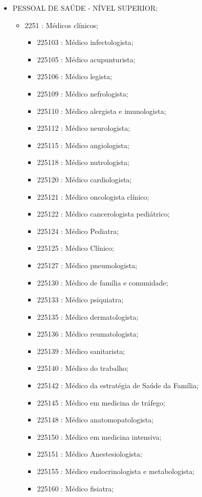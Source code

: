
\begin{itemize}
  \item PESSOAL DE SAÚDE - NÍVEL SUPERIOR;
  \begin{itemize}
    \item 2251 : Médicos clínicos;
    \begin{itemize}
      \item 225103 : Médico infectologista;
      \item 225105 : Médico acupunturista;
      \item 225106 : Médico legista;
      \item 225109 : Médico nefrologista;
      \item 225110 : Médico alergista e imunologista;
      \item 225112 : Médico neurologista;
      \item 225115 : Médico angiologista;
      \item 225118 : Médico nutrologista;
      \item 225120 : Médico cardiologista;
      \item 225121 : Médico oncologista clínico;
      \item 225122 : Médico cancerologista pediátrico;
      \item 225124 : Médico Pediatra;
      \item 225125 : Médico Clínico;
      \item 225127 : Médico pneumologista;
      \item 225130 : Médico de família e comunidade;
      \item 225133 : Médico psiquiatra;
      \item 225135 : Médico dermatologista;
      \item 225136 : Médico reumatologista;
      \item 225139 : Médico sanitarista;
      \item 225140 : Médico do trabalho;
      \item 225142 : Médico da estratégia de Saúde da Família;
      \item 225145 : Médico em medicina de tráfego;
      \item 225148 : Médico anatomopatologista;
      \item 225150 : Médico em medicina intensiva;
      \item 225151 : Médico Anestesiologista;
      \item 225155 : Médico endocrinologista e metabologista;
      \item 225160 : Médico fisiatra;

\end{itemize}
\end{itemize}
\end{itemize}
